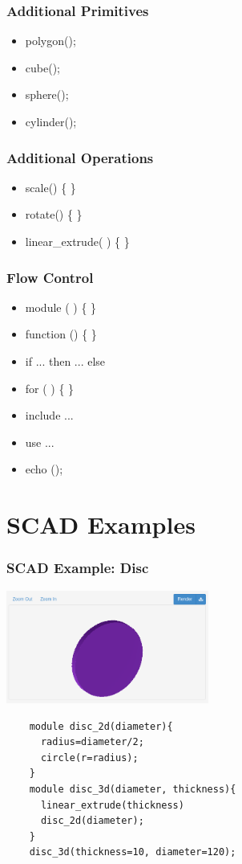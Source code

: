 \documentclass{beamer}
\begin{document}
\begin{frame}
\frametitle{Additional Primitives}
\begin{itemize}
\item polygon();
\item cube();
\item sphere();
\item cylinder();
\end{itemize}
\end{frame}

\begin{frame}
\frametitle{Additional Operations}
\begin{itemize}
\item scale() \{ \}
\item rotate() \{ \}
\item linear\_extrude( ) \{ \}
\end{itemize}
\end{frame}

\begin{frame}
\frametitle{Flow Control}
\begin{itemize}
\item module ( ) \{ \}
\item function () \{ \}
\item if ... then ... else
\item for ( ) \{ \}
\item include ...
\item use ...
\item echo ();
\end{itemize}
\end{frame}

\section{SCAD Examples}
\begin{frame}[fragile]
\frametitle{SCAD Example: Disc}
\includegraphics[width=0.5\textwidth, center]{disc_example.png}
  \lstset{basicstyle=\ttfamily\scriptsize}
    \begin{lstlisting}
    module disc_2d(diameter){
      radius=diameter/2;
      circle(r=radius);
    }
    module disc_3d(diameter, thickness){
      linear_extrude(thickness)
      disc_2d(diameter);
    }
    disc_3d(thickness=10, diameter=120);
    \end{lstlisting}
\end{frame}
\end{document}

